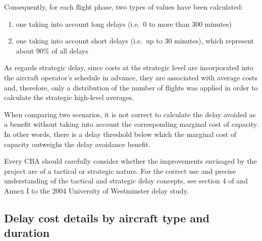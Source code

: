 \documentclass[
  11pt,
  a4paper,
]{book}
\begin{document}
Consequently, for each flight phase, two types of values have been
calculated:

\begin{enumerate}
\def\labelenumi{\arabic{enumi}.}
\item
  one taking into account long delays (i.e.~0 to more than 300 minutes)
\item
  one taking into account short delays (i.e.~up to 30 minutes), which
  represent about 90\% of all delays
\end{enumerate}

As regards strategic delay, since costs at the strategic level are
incorporated into the aircraft operator's schedule in advance, they are
associated with average costs and, therefore, only a distribution of the
number of flights was applied in order to calculate the strategic
high-level averages.

\begin{tcolorbox}[enhanced jigsaw, opacityback=0, arc=.35mm, colframe=quarto-callout-tip-color-frame, breakable, left=2mm, leftrule=.75mm, titlerule=0mm, colbacktitle=quarto-callout-tip-color!10!white, rightrule=.15mm, opacitybacktitle=0.6, bottomtitle=1mm, colback=white, toptitle=1mm, title=\textcolor{quarto-callout-tip-color}{\faLightbulb}\hspace{0.5em}{Use of costs in business cases}, bottomrule=.15mm, toprule=.15mm, coltitle=black]

When comparing two scenarios, it is not correct to calculate the delay
avoided as a benefit without taking into account the corresponding
marginal cost of capacity. In other words, there is a delay threshold
below which the marginal cost of capacity outweighs the delay avoidance
benefit.

Every CBA should carefully consider whether the improvements envisaged
by the project are of a tactical or strategic nature. For the correct
use and precise understanding of the tactical and strategic delay
concepts, see section 4 of and Annex I to the 2004 University of
Westminster delay study.

\end{tcolorbox}

\hypertarget{delay-cost-details-by-aircraft-type-and-duration}{%
\subsection{Delay cost details by aircraft type and
duration}\label{delay-cost-details-by-aircraft-type-and-duration}}
\end{document}
